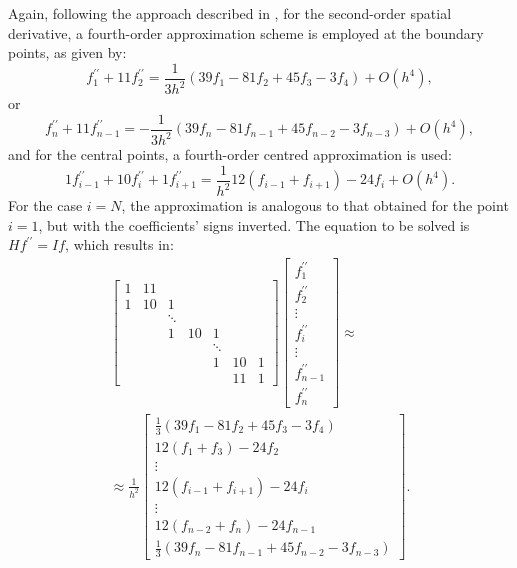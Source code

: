 \documentclass[preprint, 12pt]{elsarticle}
\begin{document}
Again, following the approach described in \citet{souza2003}, for the second-order spatial derivative, a fourth-order approximation scheme is employed at the boundary points, as given by:
\begin{equation}
    f_1^{\prime \prime} + 11f_{2}^{\prime \prime} = \frac{1}{3h^{2}}\left(39f_{1} - 81f_{2} + 45f_{3} - 3f_{4}\right)+O\left(h^4\right),
\end{equation}
or
\begin{equation}
    f_{n}^{\prime \prime} + 11f_{n-1}^{\prime \prime} = -\frac{1}{3h^{2}}\left(39f_{n} - 81f_{n-1} + 45f_{n-2} - 3f_{n-3}\right)+O\left(h^4\right),
\end{equation}
and for the central points, a fourth-order centred approximation is used:
\begin{equation}
    1 f_{i-1}^{\prime \prime}+10 f_i^{\prime \prime}+1 f_{i+1}^{\prime \prime}=\frac{1}{ h^2}12\left(f_{i-1} + f_{i+1}\right) -24f_{i}+O\left(h^4\right) .
\end{equation}
For the case $i=N$, the approximation is analogous to that obtained for the point $i=1$, but with the coefficients' signs inverted. The equation to be solved is $H f^{\prime \prime}=I f$, which results in: 
\begin{align}
\left[\begin{array}{ccccccc}
    1 & 11 & & & & & \\
    1 & 10 & 1 & & & & \\
    & & \ddots & & & & \\
    & & 1 & 10 & 1 & & \\
    & & & & \ddots & & \\
    & & & & 1 & 10 & 1 \\
    & & & & & 11 & 1
\end{array}\right]\left[\begin{array}{c}
    f_1^{\prime \prime} \\
    f_2^{\prime \prime} \\
    \vdots \\
    f_i^{\prime \prime} \\
    \vdots \\
    f_{n-1}^{\prime \prime} \\
    f_n^{\prime \prime}
\end{array}\right] \approx \nonumber\\ \approx \frac{1}{h^2}\left[\begin{array}{c}\frac{1}{3}\left(39f_1 - 81f_2 + 45f_3 - 3f_4\right) \\ 12\left(f_1 + f_3\right) -24f_2 \\ \vdots \\ 12\left(f_{i-1} + f_{i+1}\right) -24f_{i} \\ \vdots \\ 12\left(f_{n-2} + f_{n}\right) -24f_{n-1}  \\ \frac{1}{3}\left(39f_{n} - 81f_{n-1} + 45f_{n-2} - 3f_{n-3}\right)\end{array}\right].
\end{align}
\end{document}

